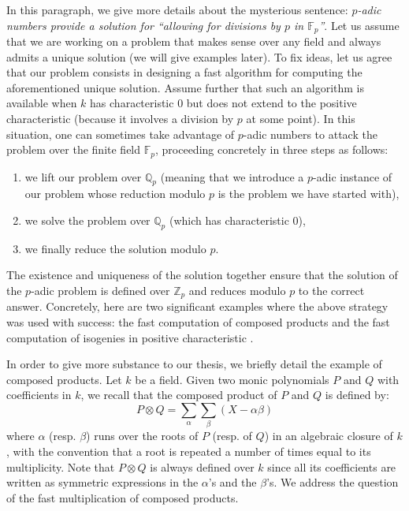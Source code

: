 \documentclass[11pt]{article}
\numberwithin{equation}{section}
\numberwithin{figure}{section}
\theoremstyle{definition}
\newcommand{\Z}{\mathbb Z}
\newcommand{\Zp}{\Z_p}
\newcommand{\Q}{\mathbb Q}
\newcommand{\Qp}{\Q_p}
\newcommand{\F}{\mathbb F}
\newcommand{\Fp}{\F_p}
\begin{document}
In this paragraph, we give more details about the mysterious sentence: 
\emph{$p$-adic numbers provide a solution for ``allowing for divisions by $p$ 
in $\Fp$''}.
Let us assume that we are working on a problem that makes sense over any 
field and always admits a unique solution (we will give examples later). 
To fix ideas, let us agree that our problem consists in designing a fast 
algorithm for computing the aforementioned unique solution. Assume 
further that such an algorithm is available when $k$ has characteristic 
$0$ but does not extend to the positive characteristic (because it
involves a division by $p$ at some point).
In this situation, one can sometimes take advantage of $p$-adic numbers to attack the 
problem over the finite field $\Fp$, proceeding concretely in three
steps as follows:
\begin{enumerate}
\renewcommand{\itemsep}{0pt}
\item we lift our 
problem over $\Qp$ (meaning that we introduce a $p$-adic instance of 
our problem whose reduction modulo $p$ is the problem we have started
with),
\item we solve the problem over $\Qp$ (which has characteristic $0$),
\item we finally reduce the solution modulo $p$. 
\end{enumerate}
The existence and uniqueness of the solution together ensure that the
solution of the $p$-adic problem is defined over $\Zp$ and reduces 
modulo $p$ to the correct answer.
Concretely, here are two significant examples where the above strategy 
was used with success: the fast computation of composed products 
\cite{BoGoPeSc05}
and the fast computation of isogenies in positive characteristic 
\cite{LeSi08,LaVa16}.

\medskip

In order to give more substance to our thesis, we briefly detail the 
example of composed products. Let $k$ be a field. Given two monic 
polynomials $P$ and $Q$ with coefficients in $k$, we recall that the 
composed product of $P$ and $Q$ is defined by:
$$P \otimes Q = \sum_\alpha \sum_\beta (X - \alpha \beta)$$
where $\alpha$ (resp. $\beta$) runs over the roots of $P$ (resp. 
of $Q$) in an algebraic closure of $k$, with the convention that a
root is repeated a number of times equal to its multiplicity. Note
that $P \otimes Q$ is always defined over $k$ since all its coefficients
are written as symmetric expressions in the $\alpha$'s and the $\beta$'s.
We address the question of the fast multiplication of composed products.
\end{document}
